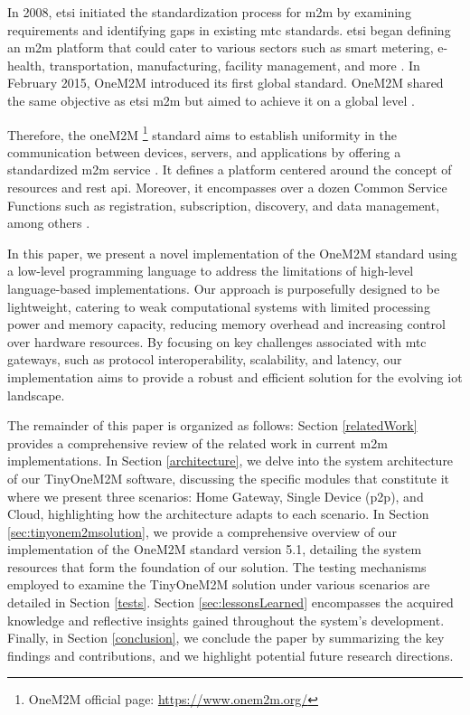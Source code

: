 \documentclass[a4paper,fleqn]{cas-dc}
\begin{document}
In 2008, \gls{etsi} initiated the standardization process for \gls{m2m} by examining requirements and identifying gaps in existing \gls{mtc} standards. \gls{etsi} began defining an \gls{m2m} platform that could cater to various sectors such as smart metering, e-health, transportation, manufacturing, facility management, and more \cite{7574435}. In February 2015, OneM2M introduced its first global standard. OneM2M shared the same objective as \gls{etsi} \gls{m2m} but aimed to achieve it on a global level \cite{pticek_architecture_2015}. 

Therefore, the oneM2M \footnote{OneM2M official page: \url{https://www.onem2m.org/}} standard aims to establish uniformity in the communication between devices, servers, and applications by offering a standardized \gls{m2m} service \cite{M2M2015}. It defines a platform centered around the concept of resources and \gls{rest} \gls{api}. Moreover, it encompasses over a dozen Common Service Functions such as registration, subscription, discovery, and data management, among others \cite{onem2m_standard}.

In this paper, we present a novel implementation of the OneM2M standard using a low-level programming language to address the limitations of high-level language-based implementations. Our approach is purposefully designed to be lightweight, catering to weak computational systems with limited processing power and memory capacity, reducing memory overhead and increasing control over hardware resources. By focusing on key challenges associated with \gls{mtc} gateways, such as protocol interoperability, scalability, and latency, our implementation aims to provide a robust and efficient solution for the evolving \gls{iot} landscape.

The remainder of this paper is organized as follows: Section \ref{relatedWork} provides a comprehensive review of the related work in current \gls{m2m} implementations. In Section \ref{architecture}, we delve into the system architecture of our TinyOneM2M software, discussing the specific modules that constitute it where we present three scenarios: Home Gateway, Single Device (\gls{p2p}), and Cloud, highlighting how the architecture adapts to each scenario. In Section \ref{sec:tinyonem2msolution}, we provide a comprehensive overview of our implementation of the OneM2M standard version 5.1, detailing the system resources that form the foundation of our solution. The testing mechanisms employed to examine the TinyOneM2M solution under various scenarios are detailed in Section \ref{tests}. Section \ref{sec:lessonsLearned} encompasses the acquired knowledge and reflective insights gained throughout the system's development. Finally, in Section \ref{conclusion}, we conclude the paper by summarizing the key findings and contributions, and we highlight potential future research directions.
\end{document}
